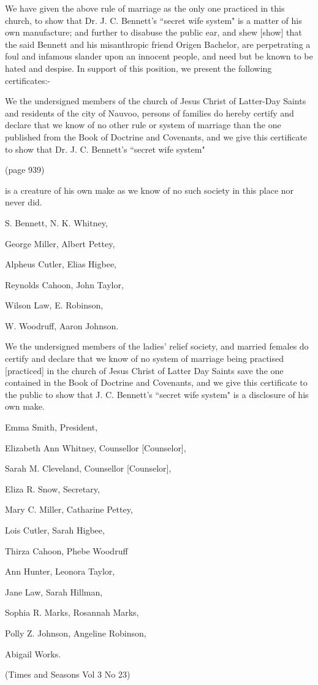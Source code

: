 We have given the above rule of marriage as the only one practiced in this church, to
show that Dr. J. C. Bennett's ``secret wife system" is a matter of his own
manufacture; and further to disabuse the public ear, and shew [show] that the said
Bennett and his misanthropic friend Origen Bachelor, are perpetrating a foul and
infamous slander upon an innocent people, and need but be known to be hated and
despise. In support of this position, we present the following certificates:-

We the undersigned members of the church of Jesus Christ of Latter-Day Saints and
residents of the city of Nauvoo, persons of families do hereby certify and declare
that we know of no other rule or system of marriage than the one published from the
Book of Doctrine and Covenants, and we give this certificate to show that Dr. J. C.
Bennett's ``secret wife system"

(page 939)

is a creature of his own make as we know of no such society in this place nor never 
did.

S. Bennett, N. K. Whitney,

George Miller, Albert Pettey,

Alpheus Cutler, Elias Higbee,

Reynolds Cahoon, John Taylor,

Wilson Law, E. Robinson,

W. Woodruff, Aaron Johnson.

We the undersigned members of the ladies' relief society, and married females do
certify and declare that we know of no system of marriage being practised [practiced]
in the church of Jesus Christ of Latter Day Saints save the one contained in the Book
of Doctrine and Covenants, and we give this certificate to the public to show that J.
C. Bennett's ``secret wife system" is a disclosure of his own make.

Emma Smith, President,

Elizabeth Ann Whitney, Counsellor [Counselor],

Sarah M. Cleveland, Counsellor [Counselor],

Eliza R. Snow, Secretary,

Mary C. Miller, Catharine Pettey,

Lois Cutler, Sarah Higbee,

Thirza Cahoon, Phebe Woodruff

Ann Hunter, Leonora Taylor,

Jane Law, Sarah Hillman,

Sophia R. Marks, Rosannah Marks,

Polly Z. Johnson, Angeline Robinson,

Abigail Works.

(Times and Seasons Vol 3 No 23)